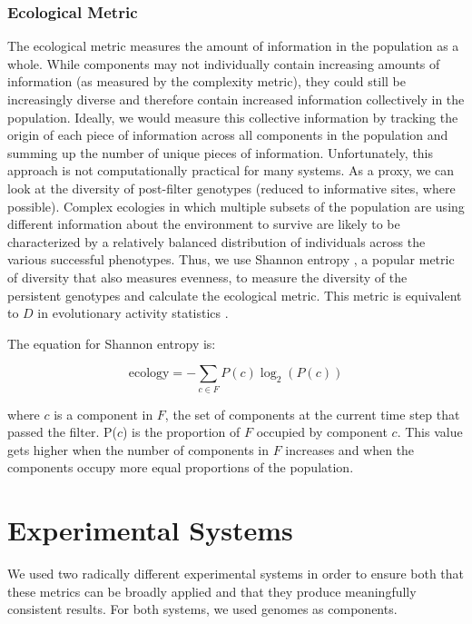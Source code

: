 \documentclass[letterpaper]{article}
\begin{document}
\subsubsection{Ecological Metric}
The ecological metric measures the amount of information in the population as a whole. While components may not individually contain increasing amounts of information (as measured by the complexity metric), they could still be increasingly diverse and therefore contain increased information collectively in the population. Ideally, we would measure this collective information by tracking the origin of each piece of information across all components in the population and summing up the number of unique pieces of information. Unfortunately, this approach is not computationally practical for many systems. As a proxy, we can look at the diversity of post-filter genotypes (reduced to informative sites, where possible). Complex ecologies in which multiple subsets of the population are using different information about the environment to survive are likely to be characterized by a relatively balanced distribution of individuals across the various successful phenotypes. Thus, we use Shannon entropy \citep{shannon_mathematical_1948}, a popular metric of diversity that also measures evenness, to measure the diversity of the persistent genotypes and calculate the ecological metric. This metric is equivalent to $D$ in evolutionary activity statistics \citep{bedau_comparison_1997}.

The equation for Shannon entropy is:

\begin{equation} 
\text{ecology} = -\sum_{c \in F}{P(c)\log_2(P(c))}
\label{eq:shannon}
\end{equation}

where $c$ is a component in $F$, the set of components at the current time step that passed the filter. P($c$) is the proportion of $F$ occupied by component $c$. This value gets higher when the number of components in $F$ increases and when the components occupy more equal proportions of the population.

\section{Experimental Systems}

We used two radically different experimental systems in order to ensure both that these metrics can be broadly applied and that they produce meaningfully consistent results. For both systems, we used genomes as components.
\end{document}
